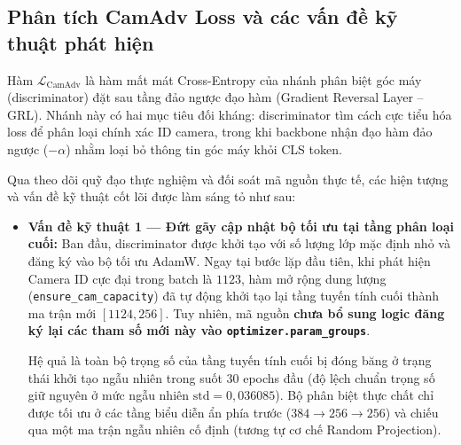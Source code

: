 \documentclass[11pt,a4paper]{article}
\begin{document}
\subsection{Phân tích CamAdv Loss và các vấn đề kỹ thuật phát hiện}
Hàm $\mathcal{L}_{\text{CamAdv}}$ là hàm mất mát Cross-Entropy của nhánh phân biệt góc máy (discriminator) đặt sau tầng đảo ngược đạo hàm (Gradient Reversal Layer -- GRL). Nhánh này có hai mục tiêu đối kháng: discriminator tìm cách cực tiểu hóa loss để phân loại chính xác ID camera, trong khi backbone nhận đạo hàm đảo ngược ($-\alpha$) nhằm loại bỏ thông tin góc máy khỏi CLS token.

Qua theo dõi quỹ đạo thực nghiệm và đối soát mã nguồn thực tế, các hiện tượng và vấn đề kỹ thuật cốt lõi được làm sáng tỏ như sau:
\begin{itemize}
    \item \textbf{Vấn đề kỹ thuật 1 --- Đứt gãy cập nhật bộ tối ưu tại tầng phân loại cuối:}
    Ban đầu, discriminator được khởi tạo với số lượng lớp mặc định nhỏ và đăng ký vào bộ tối ưu AdamW. Ngay tại bước lặp đầu tiên, khi phát hiện Camera ID cực đại trong batch là $1123$, hàm mở rộng dung lượng (\texttt{ensure\_cam\_capacity}) đã tự động khởi tạo lại tầng tuyến tính cuối thành ma trận mới $[1124, 256]$. Tuy nhiên, mã nguồn \textbf{chưa bổ sung logic đăng ký lại các tham số mới này vào \texttt{optimizer.param\_groups}}. 
    
    Hệ quả là toàn bộ trọng số của tầng tuyến tính cuối bị đóng băng ở trạng thái khởi tạo ngẫu nhiên trong suốt $30$ epochs đầu (độ lệch chuẩn trọng số giữ nguyên ở mức ngẫu nhiên $\text{std} = 0{,}036085$). Bộ phân biệt thực chất chỉ được tối ưu ở các tầng biểu diễn ẩn phía trước ($384 \to 256 \to 256$) và chiếu qua một ma trận ngẫu nhiên cố định (tương tự cơ chế Random Projection).
    

\end{itemize}
\end{document}
